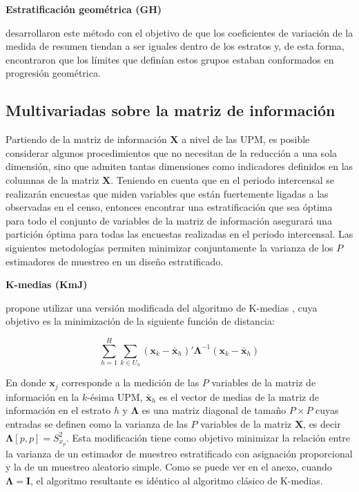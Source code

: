 \documentclass[12pt,spanish,]{book}
\begin{document}
\textbf{Estratificación geométrica (GH)}

\textcite{Gunning_Horgan_2004} desarrollaron este método con el objetivo de que los coeficientes de variación de la medida de resumen tiendan a ser iguales dentro de los estratos y, de esta forma, encontraron que los límites que definían estos grupos estaban conformados en progresión geométrica.

\hypertarget{multivariadas-sobre-la-matriz-de-informacion}{%
\subsection{Multivariadas sobre la matriz de información}\label{multivariadas-sobre-la-matriz-de-informacion}}

Partiendo de la matriz de información \(\mathbf{X}\) a nivel de las UPM, es posible considerar algunos procedimientos que no necesitan de la reducción a una sola dimensión, sino que admiten tantas dimensiones como indicadores definidos en las columnas de la matriz \(\mathbf{X}\). Teniendo en cuenta que en el periodo intercensal se realizarán encuestas que miden variables que están fuertemente ligadas a las observadas en el censo, entonces encontrar una estratificación que sea óptima para todo el conjunto de variables de la matriz de información asegurará una partición óptima para todas las encuestas realizadas en el periodo intercensal. Las siguientes metodologías permiten minimizar conjuntamente la varianza de los \(P\) estimadores de muestreo en un diseño estratificado.

\textbf{K-medias (KmJ)}

\textcite{Jarque_1981} propone utilizar una versión modificada del algoritmo de K-medias \autocite{Macqueen_1967}, cuya objetivo es la minimización de la siguiente función de distancia:

\[
\sum_{h=1}^H \sum_{k\in U_h}(\mathbf x_k - \bar {\mathbf x}_h)'\boldsymbol \Lambda^{-1}(\mathbf x_k - \bar {\mathbf x}_h)
\]

En donde \(\mathbf x_j\) corresponde a la medición de las \(P\) variables de la matriz de información en la \(k\)-ésima UPM, \(\bar {\mathbf x}_h\) es el vector de medias de la matriz de información en el estrato \(h\) y \(\boldsymbol \Lambda\) es una matriz diagonal de tamaño \(P \times P\) cuyas entradas se definen como la varianza de las \(P\) variables de la matriz \(\mathbf X\), es decir \(\boldsymbol \Lambda [p,p]=S^2_{x_p}\). Esta modificación tiene como objetivo minimizar la relación entre la varianza de un estimador de muestreo estratificado con asignación proporcional y la de un muestreo aleatorio simple. Como se puede ver en el anexo, cuando \(\boldsymbol \Lambda = \mathbf I\), el algoritmo resultante es idéntico al algoritmo clásico de K-medias.
\end{document}
